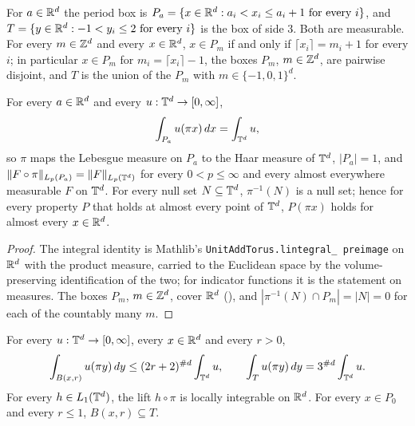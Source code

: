 \begin{definition}
\label{def:period-box}
\leanok
For $a \in \mathbb{R}^d$ the period box is
$P_a = \{x \in \mathbb{R}^d : a_i < x_i \leq a_i + 1 \text{ for every } i\}$, and
$T = \{y \in \mathbb{R}^d : -1 < y_i \leq 2 \text{ for every } i\}$ is the box of side $3$. Both are
measurable. For every $m \in \mathbb{Z}^d$ and every $x \in \mathbb{R}^d$, $x \in P_m$ if and only if
$\lceil x_i \rceil = m_i + 1$ for every $i$; in particular $x \in P_m$ for
$m_i = \lceil x_i \rceil - 1$, the boxes $P_m$, $m \in \mathbb{Z}^d$, are pairwise disjoint, and $T$ is
the union of the $P_m$ with $m \in \{-1, 0, 1\}^d$.
\end{definition}

\begin{lemma}
\label{lem:period-box-measure}
\leanok
{}
For every $a \in \mathbb{R}^d$ and every $u : \mathbb{T}^d \to [0, \infty]$,
\[
  \int_{P_a} u(\pi x) \, dx = \int_{\mathbb{T}^d} u ,
\]
so $\pi$ maps the Lebesgue measure on $P_a$ to the Haar measure of $\mathbb{T}^d$, $|P_a| = 1$, and
$\|F \circ \pi\|_{L_p(P_a)} = \|F\|_{L_p(\mathbb{T}^d)}$ for every $0 < p \leq \infty$ and every almost
everywhere measurable $F$ on $\mathbb{T}^d$. For every null set $N \subseteq \mathbb{T}^d$, $\pi^{-1}(N)$ is a
null set; hence for every property $P$ that holds at almost every point of $\mathbb{T}^d$, $P(\pi x)$
holds for almost every $x \in \mathbb{R}^d$.
\end{lemma}

\begin{proof}
\leanok
The integral identity is Mathlib's \texttt{UnitAddTorus.\allowbreak lintegral\_\allowbreak
preimage} on $\mathbb{R}^d$ with the product measure, carried to the Euclidean space by the
volume-preserving identification of the two; for indicator functions it is the statement on
measures. The boxes $P_m$, $m \in \mathbb{Z}^d$, cover $\mathbb{R}^d$ (), and
$|\pi^{-1}(N) \cap P_m| = |N| = 0$ for each of the countably many $m$.
\end{proof}

\begin{lemma}
\label{lem:period-box-counting}
\leanok
{}
For every $u : \mathbb{T}^d \to [0, \infty]$, every $x \in \mathbb{R}^d$ and every $r > 0$,
\[
  \int_{B(x, r)} u(\pi y) \, dy \leq (2r + 2)^{\#d} \int_{\mathbb{T}^d} u, \qquad
  \int_T u(\pi y) \, dy = 3^{\#d} \int_{\mathbb{T}^d} u .
\]
For every $h \in L_1(\mathbb{T}^d)$, the lift $h \circ \pi$ is locally integrable on $\mathbb{R}^d$. For every
$x \in P_0$ and every $r \leq 1$, $B(x, r) \subseteq T$.
\end{lemma}

